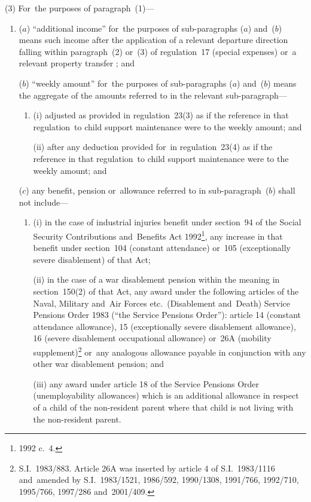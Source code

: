 \documentclass[12pt,a4paper]{article}
\begin{document}
(3) For~the purposes of paragraph~(1)—
\begin{enumerate}\item[]
($a$) “additional income” for~the purposes of sub-paragraphs ($a$)  and~($b$)  means such income after the application of a relevant departure direction falling within paragraph~(2) or~(3) of regulation~17 (special expenses)
or~a relevant property transfer%
; and

($b$) “weekly amount” for~the purposes of sub-paragraphs ($a$)  and~($b$)  means the aggregate of the amounts referred to in the relevant sub-paragraph—
\begin{enumerate}\item[]
(i) adjusted as provided in regulation~23(3) as if the reference in that regulation~to child support maintenance were to the weekly amount; and

(ii) after any deduction provided for~in regulation~23(4) as if the reference in that regulation~to child support maintenance were to the weekly amount; and
\end{enumerate}

($c$) 
any benefit, pension or~allowance referred to in sub-paragraph~($b$)  shall not include—
\begin{enumerate}\item[]
(i) 
in the case of industrial injuries benefit under section~94 of the Social Security Contributions and~Benefits Act 1992\footnote{1992 c.\ 4.}, any increase in that benefit under section~104 (constant attendance) or~105 (exceptionally severe disablement) of that Act;

(ii) 
in the case of a war disablement pension within the meaning in section~150(2) of that Act, any award under the following articles of the Naval, Military and~Air Forces etc.\ (Disablement and~Death) Service Pensions Order 1983 (“the Service Pensions Order”): article 14 (constant attendance allowance), 15 (exceptionally severe disablement allowance), 16 (severe disablement occupational allowance) or~26A (mobility supplement)\footnote{S.I.~1983/883. Article 26A was inserted by article 4 of S.I.~1983/1116 and~amended by S.I.~1983/1521, 1986/592, 1990/1308, 1991/766, 1992/710, 1995/766, 1997/286 and~2001/409.} or~any analogous allowance payable in conjunction with any other war disablement pension; and

(iii) 
any award under article 18 of the Service Pensions Order (unemployability allowances) which is an additional allowance in respect of a child of the non-resident parent where that child is not living with the non-resident parent.
\end{enumerate}
\end{enumerate}
\end{document}
